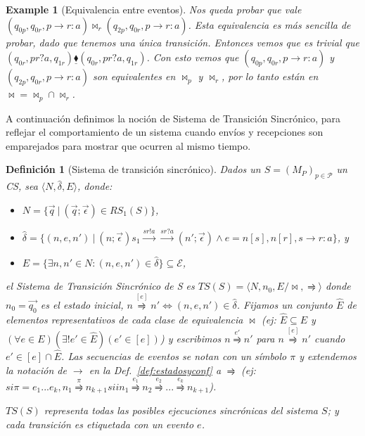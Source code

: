 \documentclass[paper=a4, fontsize=11pt, spanish]{scrartcl} %
\numberwithin{equation}{section} %
\numberwithin{figure}{section} %
\numberwithin{table}{section} %
\newtheorem{example}{Example}
\newtheorem{definition}{Definición}
\begin{document}
\begin{example}[Equivalencia entre eventos]
Nos queda probar que vale $(q_{0p}, q_{0r}, p \rightarrow r:a) \bowtie_r (q_{2p}, q_{0r}, p \rightarrow r:a)$. Esta equivalencia es más sencilla de probar, dado que tenemos una única transición. Entonces vemos que es trivial que $(q_{0r}, pr?a, q_{1r}) \underline{\blacklozenge} (q_{0r}, pr?a, q_{1r})$. Con esto vemos que $(q_{0p}, q_{0r}, p \rightarrow r:a)$ y $(q_{2p}, q_{0r}, p \rightarrow r:a)$ son equivalentes en $\bowtie_p$ y $\bowtie_r$, por lo tanto están en $\bowtie = \bowtie_p \cap \bowtie_r$.

\end{example} 
A continuación definimos la noción de Sistema de Transición Sincrónico, para reflejar el comportamiento de un sistema cuando envíos y recepciones son emparejados para mostrar que ocurren al mismo tiempo.
\newpage

\begin{definition}[Sistema de transición sincrónico] Dados un $S = (M_P)_{p \in \mathcal{P}}$ un CS, sea $\langle N,\hat{\delta}, E \rangle$, donde: 
\begin{itemize}
    \item[] $N = \{\overrightarrow{q} \ | \ (\overrightarrow{q}; \overrightarrow{\epsilon}) \in RS_1(S) \}$,
    \item[] $\hat{\delta}= \{(n, e, n') \ | \ (n;\overrightarrow{\epsilon}) s_1 \overset{sr!a}{\longrightarrow}\overset{sr?a}{\longrightarrow} (n';\overrightarrow{\epsilon})	\land e= n[s], n[r], s \rightarrow r:a \}$, y
    \item[] $ E = \{ \exists n, n' \in N : (n,e,n') \in \hat{\delta}\} \subseteq \mathcal{E}$,
\end{itemize}
   el \emph{Sistema de Transición Sincrónico} de S es $TS(S)= \langle N, n_0, E/ \bowtie,\rightrightharpoons \rangle$ donde $n_0= \overrightarrow{q_0} $ es el estado inicial, $n \overset{[e]}{\rightrightharpoons} n' \iff (n,e,n') \in \hat{\delta}$. Fijamos un conjunto $\hat{E}$ de elementos representativos de cada clase de equivalencia $\bowtie$ (ej: $\hat{E} \subseteq E$ y $\left(\forall e \in E\right)\left(\exists!e' \in \hat{E}\right)\left(e' \in [e] \right)$) y escribimos $n \overset{e'}{\rightrightharpoons} n'$ para $ n \overset{[e]}{\rightrightharpoons} n'$ cuando $ e' \in [e] \cap \hat{E} $. Las secuencias de eventos se notan con un símbolo $\pi$ y extendemos la notación de $ \rightarrow$ en la Def.~\ref{def:estadosyconf} a $\rightrightharpoons$ (ej: $si \pi = e_1 ...e_k, n_1 \overset{\pi}{\rightrightharpoons}n_{k+1} sii n_1 \overset{e_1}{\rightrightharpoons} n_2 \overset{e_2}{\rightrightharpoons}...\overset{e_k}{\rightrightharpoons} n_{k+1}$).

$TS(S)$ representa todas las posibles ejecuciones sincrónicas del sistema $S$; y cada transición es etiquetada con un evento $e$.
\end{definition}
\end{document}
